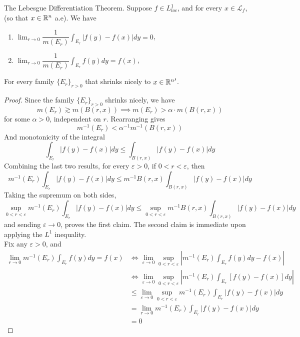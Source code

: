 \documentclass[../../main.tex]{subfiles}
\begin{document}
\providecommand{\local}{{L^{1}_{loc}}}
\providecommand{\lf}{{\mathcal{L}_f}}
\begin{wts}
The Lebesgue Differentiation Theorem. Suppose $f\in\local$, and for every $x\in \lf$, (so that $x\in{\mathbb{R}^n}$ a.e). We have
\begin{enumerate}
    \item $\lim_{r\to 0}\dfrac{1}{m(E_r)}\int_{E_r}|f(y)-f(x)|dy = 0$,
    \item $\lim_{r\to 0}\dfrac{1}{m(E_r)}\int_{E_r}f(y)dy = f(x)$,
\end{enumerate}
For every family $\{E_r\}_{r>0}$ that shrinks nicely to $x\in{\mathbb{R}^n}'$.

\end{wts}
\begin{proof}
    Since the family $\{E_r\}_{r>0}$ shrinks nicely, we have
    \[m(E_r)\gtrsim m(B(r,x))\implies m(E_r)> \alpha\cdot m(B(r,x))\]
    for some $\alpha>0$, independent on $r$. Rearranging gives
    \[m^{-1}(E_r)<\alpha^{-1}m^{-1}(B(r,x))\]
    And monotonicity of the integral 
    \[
    \int_{E_r} |f(y)-f(x)|dy\leq \int_{B(r,x)} |f(y)-f(x)|dy
    \]
    Combining the last two results, for every $\varepsilon>0$, if $0<r<\varepsilon$, then
    \[m^{-1}(E_r)\int_{E_r} |f(y)-f(x)|dy \leq m^{-1}B(r,x)\int_{B(r,x)} |f(y)-f(x)|dy\]
    Taking the supremum on both sides,
    \[\sup_{0<r<\varepsilon} m^{-1}(E_r)\int_{E_r} |f(y)-f(x)|dy \leq \sup_{0<r<\varepsilon}  m^{-1}B(r,x)\int_{B(r,x)} |f(y)-f(x)|dy\]
    and sending $\varepsilon\to 0$, proves the first claim. The second claim is immediate upon applying the $L^1$ inequality.\\

    Fix any $\varepsilon>0$, and 
    \begin{align*}
        \lim_{r\to 0}m^{-1}(E_r)\int_{E_r}f(y)dy = f(x)&\iff \lim_{\varepsilon\to 0}\sup_{0<r<\varepsilon} \left| m^{-1}(E_r)\int_{E_r}f(y)dy - f(x)\right|\\
        &\iff \lim_{\varepsilon\to 0}\sup_{0<r<\varepsilon} \left| m^{-1}(E_r)\int_{E_r}[f(y) - f(x)]dy\right|\\
        &\leq \lim_{\varepsilon\to 0}\sup_{0<r<\varepsilon} m^{-1}(E_r)\int_{E_r}|f(y) - f(x)|dy\\
        &=\lim_{r\to 0}m^{-1}(E_r)\int_{E_r}|f(y) - f(x)|dy\\
        &=0
    \end{align*}
\end{proof}
\end{document}
